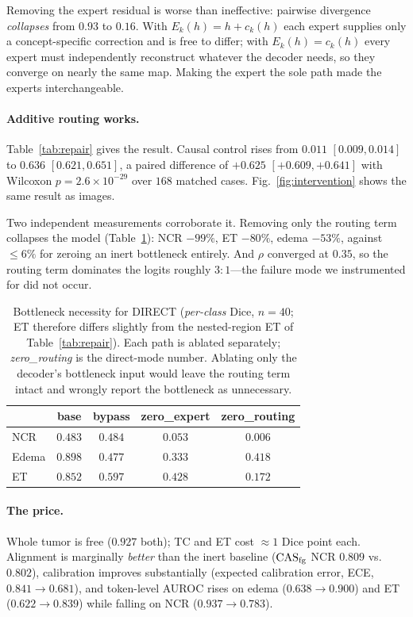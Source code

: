 Removing the expert residual is worse than ineffective: pairwise divergence \emph{collapses} from
$0.93$ to $0.16$. With $E_k(h)=h+c_k(h)$ each expert supplies only a concept-specific correction
and is free to differ; with $E_k(h)=c_k(h)$ every expert must independently reconstruct whatever
the decoder needs, so they converge on nearly the same map. Making the expert the sole path made
the experts interchangeable.

\paragraph{Additive routing works.}
Table~\ref{tab:repair} gives the result. Causal control rises from $0.011$ $[0.009,0.014]$ to
$\mathbf{0.636}$ $[0.621,0.651]$, a paired difference of $+0.625$ $[+0.609,+0.641]$ with Wilcoxon
$p{=}2.6\times10^{-29}$ over $168$ matched cases. Fig.~\ref{fig:intervention} shows the same result
as images.

Two independent measurements corroborate it. Removing only the routing term collapses the model
(Table~\ref{tab:necessity}): NCR $-99\%$, ET $-80\%$, edema $-53\%$, against ${\le}6\%$ for
zeroing an inert bottleneck entirely. And $\rho$ converged at $0.35$, so the routing term
dominates the logits roughly $3\!:\!1$---the failure mode we instrumented for did not occur.

\begin{table}[t]\centering\small
\caption{Bottleneck necessity for DIRECT (\emph{per-class} Dice, $n{=}40$; ET therefore differs
slightly from the nested-region ET of Table~\ref{tab:repair}). Each path is ablated separately;
\emph{zero\_routing} is the direct-mode number. Ablating only the decoder's bottleneck input would
leave the routing term intact and wrongly report the bottleneck as unnecessary.}
\label{tab:necessity}
\begin{tabular}{lcccc}
\toprule
& base & bypass & zero\_expert & \textbf{zero\_routing} \\
\midrule
NCR   & $0.483$ & $0.484$ & $0.053$ & $\mathbf{0.006}$ \\
Edema & $0.898$ & $0.477$ & $0.333$ & $\mathbf{0.418}$ \\
ET    & $0.852$ & $0.597$ & $0.428$ & $\mathbf{0.172}$ \\
\bottomrule
\end{tabular}
\end{table}

\paragraph{The price.}
Whole tumor is free ($0.927$ both); TC and ET cost ${\approx}1$ Dice point each.
Alignment is marginally \emph{better} than the inert baseline ($\mathrm{CAS}_{\mathrm{fg}}$ NCR $0.809$ vs.\ $0.802$),
calibration improves substantially (expected calibration error, ECE, $0.841\!\to\!0.681$), and token-level AUROC rises on edema
($0.638\!\to\!0.900$) and ET ($0.622\!\to\!0.839$) while falling on NCR ($0.937\!\to\!0.783$).

